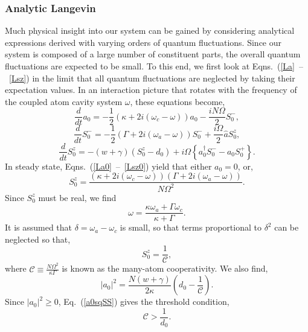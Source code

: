 \documentclass[aps,prl,twocolumn,
superscriptaddress,groupedaddress]{revtex4}
\begin{document}
\subsubsection{Analytic Langevin}

Much physical insight into our system can be gained by considering
analytical expressions derived with varying orders of quantum
fluctuations. Since our system is composed of a large number of
constituent parts, the overall quantum fluctuations are expected to be
small. To this end, we first look at Eqns.~(\ref{La}~--~\ref{Lsz}) in
the limit that all quantum fluctuations are neglected by taking their
expectation values. In an interaction picture that rotates with the
frequency of the coupled atom cavity system $\omega$, these equations
become,
\begin{equation}
\frac{d}{dt} a_0= -\frac{1}{2} (\kappa +2i(\omega_c-\omega)) a_0
-\frac{i N \Omega}{2} S_0^{-},
\label{La0}
\end{equation}
\begin{equation}
\frac{d}{dt} S_0^{-} =
-\frac{1}{2} \left(\Gamma +2 i (\omega_a-\omega) \right)  S_0^{-}
+\frac{i \Omega}{2} \hat{a} S_0^{z},
\end{equation}
\begin{equation}
\frac{d}{dt} S_0^{z} = -(w+\gamma)\left( S_0^{z} - d_0\right)
+i\Omega \left\{ a_0^{\dagger} S_0^{-} - a_0 S_0^{+} \right\}.
\label{Lsz0}
\end{equation}
In steady state, Eqns.~(\ref{La0}~--~\ref{Lsz0}) yield that either
$a_0=0$, or,
\begin{equation}
S_0^{z}=
\frac{(\kappa+2i(\omega_c-\omega))(\Gamma+2i(\omega_a-\omega))}{N\Omega^2}.
\end{equation}
Since $S_0^{z}$ must be real, we find
\begin{equation}
\omega = \frac{\kappa \omega_a + \Gamma \omega_c}{\kappa+\Gamma}.
\label{atomcavityfrequencycenter1}
\end{equation}
It is assumed that $\delta = \omega_a-\omega_c$ is small, so that terms
proportional to $\delta^2$ can be neglected so that,
\begin{equation}
S_0^{z}=\frac{1}{\mathcal{C}},
\end{equation}
where $\mathcal{C}\equiv \frac{N \Omega^2}{\kappa \Gamma}$ is known as
the many-atom cooperativity. We also find,
\begin{equation}
|a_0|^2=\frac{N(w+\gamma)}{2 \kappa} (d_0 - \frac{1}{\mathcal{C}}).
\label{a0sqSS}
\end{equation}
Since $|a_0|^2 \geq 0$, Eq.~(\ref{a0sqSS}) gives the threshold
condition,
\begin{equation}
\mathcal{C}>\frac{1}{d_0}.
\label{ThresholdCondition}
\end{equation}
\end{document}
